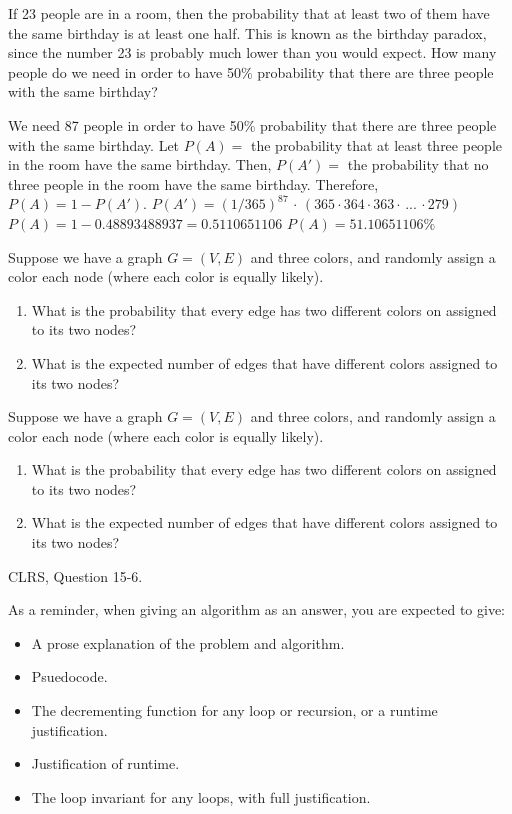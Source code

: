 \documentclass{article}
\author{Gavin Austin, George Engel, Troy Oster}
\date{due: 18 October 2019}
\begin{document}
\nextprob
If 23 people are in a room, then the probability that at least two of them have
the same birthday is at least one half.  This is known as the birthday paradox,
since the number 23 is probably much lower than you would expect.  How many
people do we need in order to have 50\% probability that there are three people
with the same birthday?

We need 87 people in order to have 50\% probability that there are three people with the same birthday.
\newline \newline Let $P(A) = $ the probability that at least three people in the room have the same birthday.
\newline Then, $P(A') = $ the probability that no three people in the room have the same birthday.
\newline Therefore, $P(A) = 1 - P(A')$.
\newline \newline $P(A') = (1/365)^{87} \,\cdot\, (365 \cdot 364 \cdot 363 \cdot \, ... \, \cdot 279)$
\newline $P(A) = 1 - 0.48893488937 = 0.5110651106$
\newline $P(A) = 51.10651106\%$


\nextprob
Suppose we have a graph $G=(V,E)$ and three colors, and randomly assign a color
each node (where each color is equally likely).
\begin{enumerate}
    \item What is the probability that every edge has two different colors on
        assigned to its two nodes?
    \item What is the expected number of edges that have different colors
        assigned to its two nodes?
\end{enumerate}

\nextprob
Suppose we have a graph $G=(V,E)$ and three colors, and randomly assign a color
each node (where each color is equally likely).
\begin{enumerate}
    \item What is the probability that every edge has two different colors on
        assigned to its two nodes?
    \item What is the expected number of edges that have different colors
        assigned to its two nodes?
\end{enumerate}

\nextprob
CLRS, Question 15-6.

As a reminder, when giving an algorithm as an answer, you
are expected to give:
\begin{itemize}
    \item A prose explanation of the problem and algorithm.
    \item Psuedocode.
    \item The decrementing function for any loop or recursion, or a runtime
        justification.
    \item Justification of runtime.
    \item The loop invariant for any loops, with full justification.
\end{itemize}
\end{document}
